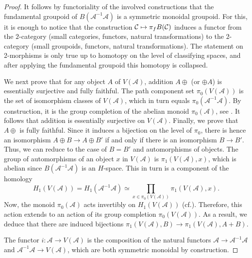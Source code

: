 \documentclass[11pt]{article}
\newcommand{\cf}{cf.\xspace}
\newcommand\mto{\mathchoice{\longmapsto}{\mapsto}{\mapsto}{\mapsto}}
\theoremstyle{plain}
\theoremstyle{definition}
\newcommand{\Acal}{\mathcal A}
\newcommand{\Ccal}{\mathcal C}
\begin{document}
\begin{proof}
It follows by functoriality of the involved constructions that the fundamental groupoid of $B(\Acal^{-1} \Acal)$ is a symmetric monoidal groupoid. For this, it is enough to notice that the construction $\Ccal\mto \pi_{f}B(\Ccal)$ induces a functor from the $2$-category (small categories, functors, natural transformations) to the $2$-category (small groupoids, functors, natural transformations). The statement on 2-morphisms is only true up to homotopy on the level of classifying spaces, and after applying the fundamental groupoid this homotopy is collapsed.

We next prove that for any object $A$ of $V(\Acal)$, addition $A \oplus$ (or $\oplus A$) is essentially surjective and fully faithful. The path component set $\pi_0(V(\Acal))$ is the set of isomorphism classes of $V(\Acal)$, which in turn equals $\pi_{0}(\Acal^{-1}\Acal)$. By construction, it is the group completion of the abelian monoid $\pi_0(\Acal)$, see \cite[Lem.\,13.3.4]{Richter}. It follows that addition is essentially surjective on $V(\Acal)$. Finally, we prove that $A \oplus$ is fully faithful. Since it induces a bijection on the level of $\pi_0$, there is hence an isomorphism $A \oplus B \to A \oplus B'$ if and only if there is an isomorphism $B \to B'$. Thus, we can reduce to the case of $B = B'$ and automorphisms of objects. The group of automorphisms of an object $x$ in $V(\Acal)$ is $\pi_1(V(\Acal), x)$, which is abelian since $B(\Acal^{-1} \Acal)$ is an $H$-space. This in turn is a component of the homology
\begin{displaymath}
H_{1}(V(\Acal))=H_{1}(\Acal^{-1}\Acal)\simeq\prod_{x\in\pi_{0}(V(\Acal))}\pi_{1}(V(\Acal),x).
\end{displaymath}
Now, the monoid $\pi_{0}(\Acal)$ acts invertibly on $H_{1}(V(\Acal))$ (\cf \cite[p.\,221]{Grayson}). Therefore, this action extends to an action of its group completion $\pi_0(V(\Acal))$. As a result, we deduce that there are induced bijections $\pi_1(V(\Acal), B) \to \pi_1(V(\Acal), A+B)$.

The functor $i: \Acal \to V(\Acal)$ is the composition of the natural functors $\Acal \to \Acal^{-1}\Acal$ and $\Acal^{-1}\Acal\to V(\Acal)$, which are both symmetric monoidal by construction.


\end{proof}
\end{document}
